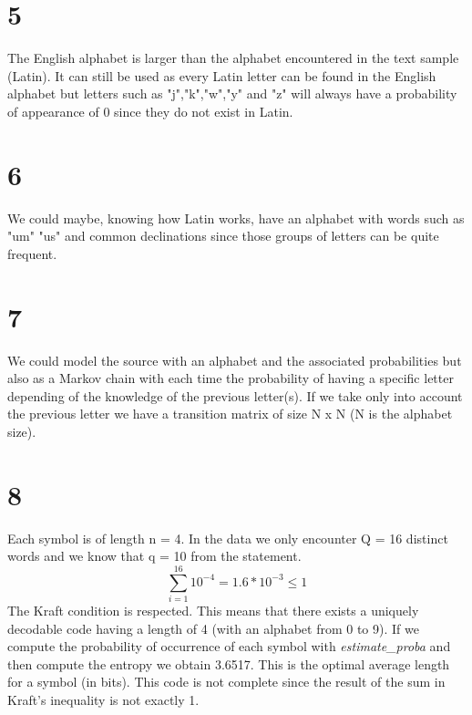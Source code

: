 \documentclass[a4paper,12pt]{article}
\begin{document}
\section*{5}
The English alphabet is larger than the alphabet encountered in the text sample (Latin). It can still be used as every Latin letter can be found in the English alphabet but letters such as "j","k","w","y" and "z" will always have a probability of appearance of 0 since they do not exist in Latin.

\section*{6}
We could maybe, knowing how Latin works, have an alphabet with words such as "um" "us" and common declinations since those groups of letters can be quite frequent.

\section*{7}
We could model the source with an alphabet and the associated probabilities but also as a Markov chain with each time the probability of having a specific letter depending of the knowledge of the previous letter(s). If we take only into account the previous letter we have a transition matrix of size N x N (N is the alphabet size).  
\section*{8}
Each symbol is of length n = 4. In the data we only encounter Q = 16 distinct words and we know that q = 10 from the statement. 
\begin{equation}
\sum_{i=1}^{16} 10^{-4} = 1.6*10^{-3} \leq 1
\end{equation} 
The Kraft condition is respected. This means that there exists a uniquely decodable code having a length of 4 (with an alphabet from 0 to 9).
If we compute the probability of occurrence of each symbol with \textit{estimate\_proba} and then compute the entropy we obtain 3.6517. This is the optimal average length for a symbol (in bits). This code is not complete since the result of the sum in Kraft's inequality is not exactly 1.
\end{document}
